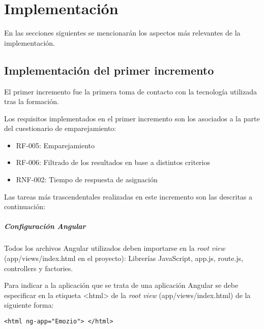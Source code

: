 \chapter{Implementación}

En las secciones siguientes se mencionarán los aspectos más relevantes de la implementación.\newline

\section{Implementación del primer incremento}
El primer incremento fue la primera toma de contacto con la tecnología utilizada tras la formación.\newline



Los requisitos implementados en el primer incremento son los asociados a la parte del cuestionario de emparejamiento:



\begin{itemize}
\item RF-005: Emparejamiento 
\item RF-006: Filtrado de los resultados en base a distintos criterios
\item RNF-002: Tiempo de respuesta de asignación
\end{itemize}



Las tareas más trascendentales realizadas en este incremento son las descritas a continuación:


 
\paragraph*{Configuración Angular} 


Todos los archivos Angular utilizados deben importarse en la \textit{root view} (app/views/index.html en el proyecto): Librerías JavaScript, app.js, route.js, controllers y factories.\newline



Para indicar a la aplicación que se trata de una aplicación Angular se debe especificar en la etiqueta <html> de la \textit{root view} (app/views/index.html) de la siguiente forma:



\medskip
\begin{lstlisting}
<html ng-app="Emozio"> </html>
\end{lstlisting}



